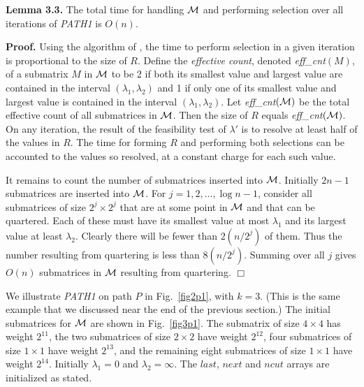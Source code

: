 {{{\noindent
{\bf Lemma 3.3.}
The total time for handling $\cal M$ and
performing selection over all iterations of {\it PATH1} is $O(n)$.

\noindent
{\bf Proof.}
Using the algorithm of \cite{BFPRT},
the time to perform selection in a given iteration
is proportional to the size of $R$.
Define the {\it effective count}, denoted {\it eff\_cnt}$(M)$,
of a submatrix $M$ in $\cal M$ to be
2 if both its smallest value and largest value
are contained in the interval $(\lambda_1, \lambda_2)$
and 1 if only one of its smallest value and largest value
is contained in the interval $(\lambda_1, \lambda_2)$.
Let {\it eff\_cnt}$(\cal M )$ be the total effective count
of all submatrices in $\cal M$.
Then the size of $R$ equals {\it eff\_cnt}$(\cal M )$.
On any iteration, the result of the feasibility test of $\lambda '$
is to resolve at least half of the values in $R$.
The time for forming $R$ and performing both selections
can be accounted to the values so resolved,
at a constant charge for each such value.

It remains to count the number of submatrices inserted into $\cal M$.
Initially $2n-1$ submatrices are inserted into $\cal M$.
For $j = 1, 2, \ldots ,\log n -1$,
consider all submatrices of size $2^j \times 2^j$
that are at some point in $\cal M$ and that can be quartered.
Each of these must have its smallest value at most $\lambda_1$
and its largest value at least $\lambda_2$.
Clearly there will be fewer than $2(n/2^j)$ of them.
Thus the number resulting from quartering is less than $8(n/2^j)$.
Summing over all $j$ gives $O(n)$ submatrices in $\cal M$
resulting from quartering.
$\Box$
\bigskip

We illustrate {\it PATH1} on path $P$ in Fig.~\ref{fig2p1}, with $k=3$.
(This is the same example that we discussed near the end of the previous section.)
The initial submatrices for ${\cal M}$ are shown in Fig.~\ref{fig3p1}.
The submatrix of size $4 \times 4$ has weight $2^{11}$,
the two submatrices of size $2 \times 2$ have weight $2^{12}$,
four submatrices of size $1 \times 1$ have weight $2^{13}$,
and the remaining eight submatrices of size $1 \times 1$ have weight $2^{14}$.
Initially $\lambda_1 = 0$ and $\lambda_2 = \infty$.
The $last$, $next$ and $ncut$ arrays are initialized as stated.

}}}
